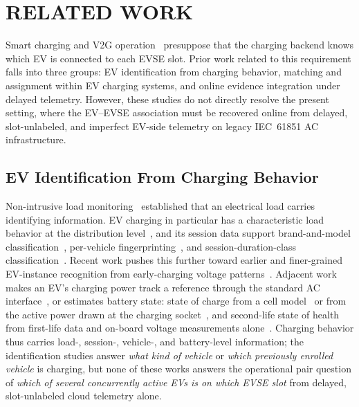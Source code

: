 \documentclass{ieeeaccess}
\newif\ifhighlight \highlightfalse
\DeclareRobustCommand{\revised}[1]{\ifhighlight{\color{blue}#1}\else{\color{.}#1}\fi}
\begin{document}
    \section{RELATED WORK}

    \revised{Smart charging and V2G operation~\cite{b2,b3,b5} presuppose that the charging backend knows which EV is connected to each EVSE slot.}
    Prior work related to this requirement falls into three groups: EV identification from charging behavior, matching and assignment within EV charging systems, and online evidence integration under delayed telemetry.
    However, these studies do not directly resolve the present setting, where the EV--EVSE association must be recovered online from delayed, \revised{slot-unlabeled}, and imperfect EV-side telemetry on legacy IEC~61851 AC infrastructure.

    \subsection{EV Identification From Charging Behavior}
    Non-intrusive load monitoring~\cite{bhart} established that an electrical load carries identifying information.
    \revised{EV charging in particular has a characteristic load behavior at the distribution level~\cite{b9}, and its session data support brand-and-model classification~\cite{b10}, per-vehicle fingerprinting~\cite{b11}, and session-duration-class classification~\cite{b12}.}
    Recent work pushes this further toward earlier and finer-grained EV-instance recognition from early-charging voltage patterns~\cite{bmarchiori25}.
    \revised{Adjacent work makes an EV's charging power track a reference through the standard AC interface~\cite{bferretti24}, or estimates battery state: state of charge from a cell model~\cite{b20} or from the active power drawn at the charging socket~\cite{b21}, and second-life state of health from first-life data and on-board voltage measurements alone~\cite{bjameel24}.}
    \revised{Charging behavior thus carries load-, session-, vehicle-, and battery-level information; the identification studies answer \emph{what kind of vehicle} or \emph{which previously enrolled vehicle} is charging, but none of these works answers the operational pair question of \emph{which of several concurrently active EVs is on which EVSE slot} from delayed, slot-unlabeled cloud telemetry alone.}
\end{document}
